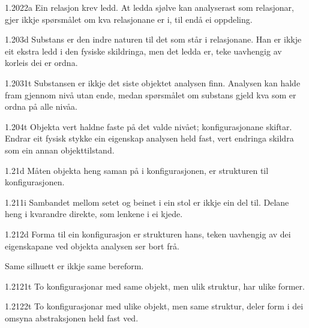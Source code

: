 \begin{formproposition}{1.2022}{a}
Ein relasjon krev ledd. At ledda sjølve kan analyserast som relasjonar, gjer ikkje spørsmålet om kva relasjonane er i, til endå ei oppdeling.
\end{formproposition}

\begin{formproposition}{1.203}{d}
Substans er den indre naturen til det som står i relasjonane. Han er ikkje eit ekstra ledd i den fysiske skildringa, men det ledda er, teke uavhengig av korleis dei er ordna.
\end{formproposition}

\begin{formproposition}{1.2031}{t}
Substansen er ikkje det siste objektet analysen finn. Analysen kan halde fram gjennom nivå utan ende, medan spørsmålet om substans gjeld kva som er ordna på alle nivåa.
\end{formproposition}

\begin{formproposition}{1.204}{t}
Objekta vert haldne faste på det valde nivået; konfigurasjonane skiftar. Endrar eit fysisk stykke ein eigenskap analysen held fast, vert endringa skildra som ein annan objekttilstand.
\end{formproposition}

\begin{formproposition}{1.21}{d}
Måten objekta heng saman på i konfigurasjonen, er strukturen til konfigurasjonen.
\end{formproposition}

\begin{formproposition}{1.211}{i}
Sambandet mellom setet og beinet i ein stol er ikkje ein del til. Delane heng i kvarandre direkte, som lenkene i ei kjede.
\end{formproposition}

\begin{formproposition}{1.212}{d}
Forma til ein konfigurasjon er strukturen hans, teken uavhengig av dei eigenskapane ved objekta analysen ser bort frå.

Same silhuett er ikkje same bereform.
\end{formproposition}

\begin{formproposition}{1.2121}{t}
To konfigurasjonar med same objekt, men ulik struktur, har ulike former.
\end{formproposition}

\begin{formproposition}{1.2122}{t}
To konfigurasjonar med ulike objekt, men same struktur, deler form i dei omsyna abstraksjonen held fast ved.
\end{formproposition}

